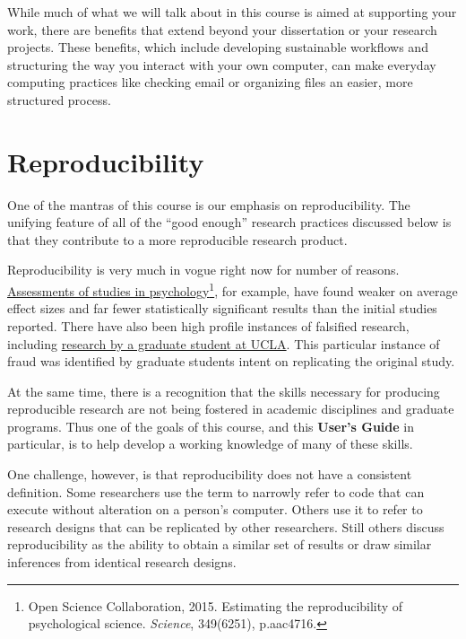 \documentclass[]{book}
\let\rmarkdownfootnote\footnote%
\def\footnote{\protect\rmarkdownfootnote}
\theoremstyle{definition}
\theoremstyle{definition}
\theoremstyle{remark}
\begin{document}
While much of what we will talk about in this course is aimed at
supporting your work, there are benefits that extend beyond your
dissertation or your research projects. These benefits, which include
developing sustainable workflows and structuring the way you interact
with your own computer, can make everyday computing practices like
checking email or organizing files an easier, more structured process.

\section{Reproducibility}\label{reproducibility}

One of the mantras of this course is our emphasis on reproducibility.
The unifying feature of all of the ``good enough'' research practices
discussed below is that they contribute to a more reproducible research
product.

Reproducibility is very much in vogue right now for number of reasons.
\href{http://science.sciencemag.org/content/349/6251/aac4716}{Assessments
of studies in psychology}\footnote{Open Science Collaboration, 2015.
  Estimating the reproducibility of psychological science.
  \emph{Science}, 349(6251), p.aac4716.}, for example, have found weaker
on average effect sizes and far fewer statistically significant results
than the initial studies reported. There have also been high profile
instances of falsified research, including
\href{http://nymag.com/scienceofus/2015/05/how-a-grad-student-uncovered-a-huge-fraud.html}{research
by a graduate student at UCLA}. This particular instance of fraud was
identified by graduate students intent on replicating the original
study.

At the same time, there is a recognition that the skills necessary for
producing reproducible research are not being fostered in academic
disciplines and graduate programs. Thus one of the goals of this course,
and this \textbf{User's Guide} in particular, is to help develop a
working knowledge of many of these skills.

One challenge, however, is that reproducibility does not have a
consistent definition. Some researchers use the term to narrowly refer
to code that can execute without alteration on a person's computer.
Others use it to refer to research designs that can be replicated by
other researchers. Still others discuss reproducibility as the ability
to obtain a similar set of results or draw similar inferences from
identical research designs.
\end{document}
